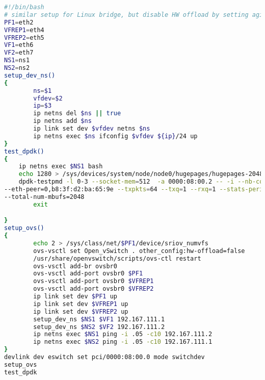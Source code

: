 \begin{lstlisting}[language=sh, caption={DPDK-pktgen consumes all RXQ}, label={lst:fairness}]
#!/bin/bash
# similar setup for Linux bridge, but disable HW offload by setting aging=0
PF1=eth2
VFREP1=eth4
VFREP2=eth5
VF1=eth6
VF2=eth7
NS1=ns1
NS2=ns2
setup_dev_ns()
{
        ns=$1
        vfdev=$2
        ip=$3
        ip netns del $ns || true
        ip netns add $ns
        ip link set dev $vfdev netns $ns
        ip netns exec $ns ifconfig $vfdev ${ip}/24 up
}
test_dpdk()
{
    ip netns exec $NS1 bash
    echo 1280 > /sys/devices/system/node/node0/hugepages/hugepages-2048kB/nr_hugepages
    dpdk-testpmd -l 0-3 --socket-mem=512  -a 0000:08:00.2 -- -i --nb-cores=1 --forward-mode=txonly \
--eth-peer=0,b8:3f:d2:ba:65:9e --txpkts=64 --txq=1 --rxq=1 --stats-period=1 --txonly-multi-flow \
--total-num-mbufs=2048
        exit

}
setup_ovs()
{
        echo 2 > /sys/class/net/$PF1/device/sriov_numvfs
        ovs-vsctl set Open_vSwitch . other_config:hw-offload=false 
        /usr/share/openvswitch/scripts/ovs-ctl restart
        ovs-vsctl add-br ovsbr0
        ovs-vsctl add-port ovsbr0 $PF1
        ovs-vsctl add-port ovsbr0 $VFREP1
        ovs-vsctl add-port ovsbr0 $VFREP2
        ip link set dev $PF1 up
        ip link set dev $VFREP1 up
        ip link set dev $VFREP2 up
        setup_dev_ns $NS1 $VF1 192.167.111.1
        setup_dev_ns $NS2 $VF2 192.167.111.2
        ip netns exec $NS1 ping -i .05 -c10 192.167.111.2
        ip netns exec $NS2 ping -i .05 -c10 192.167.111.1
}
devlink dev eswitch set pci/0000:08:00.0 mode switchdev
setup_ovs
test_dpdk
\end{lstlisting}
